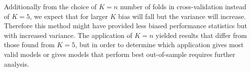 Additionally from the choice of $K=n$ number of folds in cross-validation instead of $K=5$, we expect that for larger $K$ bias will fall but the variance will increase.
Therefore this method might have provided less biased performance statistics but with increased variance.
The application of $K=n$ yielded results that differ from those found from $K=5$, but in order to determine which application gives most valid models or gives models that perform best out-of-sample requires further analysis. 